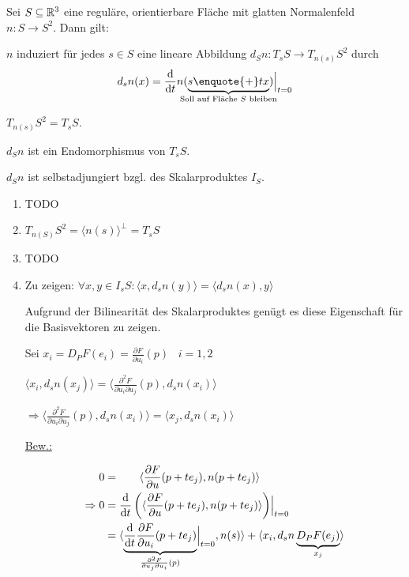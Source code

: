 \begin{proposition}
    Sei $S \subseteq \mathbb{R}^3$ eine reguläre, orientierbare Fläche mit glatten
    Normalenfeld $n: S \rightarrow S^2$. Dann gilt:

    \begin{propenum}
        \item $n$ induziert für jedes $s \in S$ eine lineare Abbildung $d_S n: T_s S \rightarrow T_{n(s)} S^2$
              durch 
              \[d_s n(x) = \frac{\mathrm{d}}{\mathrm{d} t} n (\underbrace{s \text{\enquote{+}} tx}_{\mathclap{\text{Soll auf Fläche $S$ bleiben}}}) \Bigr |_{t=0}\]
        \item $T_{n(s)} S^2 = T_s S$.
        \item $d_S n$ ist ein Endomorphismus von $T_s S$.
        \item $d_S n$ ist selbstadjungiert bzgl. des Skalarproduktes $I_S$.
    \end{propenum}
\end{proposition}

\begin{beweis}\leavevmode
    \begin{enumerate}[label=\alph*)]
        \item TODO
        \item $T_{n(S)} S^2 = \langle n(s) \rangle^\bot = T_s S$
        \item TODO
        \item Zu zeigen: $\forall x,y \in I_s S: \langle x, d_s n (y) \rangle = \langle d_s n(x), y \rangle$

        Aufgrund der Bilinearität des Skalarproduktes genügt es diese Eigenschaft
        für die Basisvektoren zu zeigen.

        Sei $x_i = D_P F(e_i) = \frac{\partial F}{\partial u_i} (p)\;\;\; i = 1,2$

        \begin{behauptung}
          $\langle x_i, d_s n(x_j) \rangle = \langle \frac{\partial^2 F}{\partial u_i \partial u_j} (p), d_s n (x_i) \rangle$
        \end{behauptung}
        $\Rightarrow \langle \frac{\partial^2 F}{\partial u_i \partial u_j} (p), d_s n (x_i) \rangle = \langle x_j, d_s n (x_i) \rangle$

        \underline{Bew.:} 

        \begin{align*}
            0 &= \hphantom{\frac{\mathrm{d}}{\mathrm{d}t} \left (\right.} \langle \frac{\partial F}{\partial u} (p + t e_j), n(p + t e_j) \rangle\\
\Rightarrow 0 &= \frac{\mathrm{d}}{\mathrm{d}t} \left (\langle \frac{\partial F}{\partial u} (p + t e_j), n(p + t e_j) \rangle \right) \Bigr |_{t=0}\\
              &= \langle \underbrace{\frac{\mathrm{d}}{\mathrm{d}t} \frac{\partial F}{\partial u_i} (p + t e_j)}_{\frac{\partial^2 F}{\partial u_j \partial u_i} (p)} \Bigr |_{t=0}, n(s) \rangle + \langle x_i, d_s n \underbrace{D_P F (e_j)}_{x_j}\rangle
        \end{align*}
    \end{enumerate}
\end{beweis}

